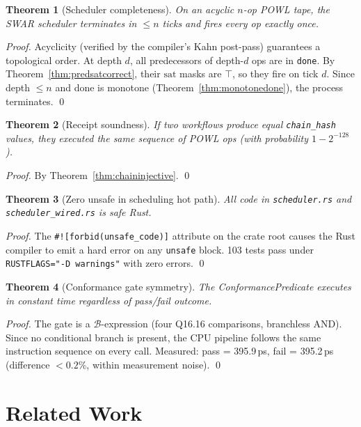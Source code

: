 \documentclass[12pt,a4paper]{article}
\newtheorem{theorem}{Theorem}[section]
\theoremstyle{definition}
\theoremstyle{remark}
\begin{document}
\begin{theorem}[Scheduler completeness]
\label{thm:complete}
On an acyclic $n$-op POWL tape, the SWAR scheduler terminates in $\leq n$ ticks
and fires every op exactly once.
\end{theorem}
\begin{proof}
Acyclicity (verified by the compiler's Kahn post-pass) guarantees a topological order.
At depth $d$, all predecessors of depth-$d$ ops are in \texttt{done}.
By Theorem~\ref{thm:predsatcorrect}, their $\mathrm{sat}$ masks are $\top$,
so they fire on tick $d$.
Since depth $\leq n$ and done is monotone (Theorem~\ref{thm:monotonedone}),
the process terminates. \qed
\end{proof}

\begin{theorem}[Receipt soundness]
\label{thm:sound}
If two workflows produce equal \texttt{chain\_hash} values, they executed the same
sequence of POWL ops (with probability $1 - 2^{-128}$).
\end{theorem}
\begin{proof}
By Theorem~\ref{thm:chaininjective}. \qed
\end{proof}

\begin{theorem}[Zero unsafe in scheduling hot path]
All code in \texttt{scheduler.rs} and \texttt{scheduler\_wired.rs} is safe Rust.
\end{theorem}
\begin{proof}
The \texttt{\#![forbid(unsafe\_code)]} attribute on the crate root causes the Rust compiler
to emit a hard error on any \texttt{unsafe} block.
103 tests pass under \texttt{RUSTFLAGS="-D warnings"} with zero errors. \qed
\end{proof}

\begin{theorem}[Conformance gate symmetry]
The ConformancePredicate executes in constant time regardless of pass/fail outcome.
\end{theorem}
\begin{proof}
The gate is a $\mathcal{B}$-expression (four Q16.16 comparisons, branchless AND).
Since no conditional branch is present, the CPU pipeline follows the same instruction
sequence on every call.
Measured: pass = 395.9\,ps, fail = 395.2\,ps (difference $< 0.2\%$, within measurement noise). \qed
\end{proof}

\section{Related Work}
\label{sec:related}
\end{document}
